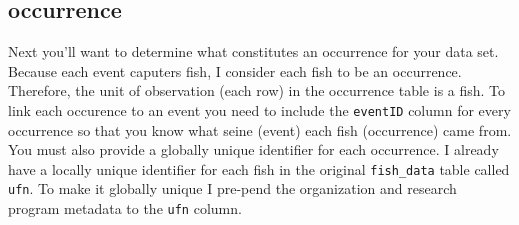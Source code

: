 \documentclass[
]{book}
\begin{document}
\hypertarget{occurrence}{%
\subsection{occurrence}\label{occurrence}}

Next you'll want to determine what constitutes an occurrence for your data set. Because each event caputers fish, I consider each fish to be an occurrence. Therefore, the unit of observation (each row) in the occurrence table is a fish. To link each occurence to an event you need to include the \texttt{eventID} column for every occurrence so that you know what seine (event) each fish (occurrence) came from. You must also provide a globally unique identifier for each occurrence. I already have a locally unique identifier for each fish in the original \texttt{fish\_data} table called \texttt{ufn}. To make it globally unique I pre-pend the organization and research program metadata to the \texttt{ufn} column.
\end{document}
